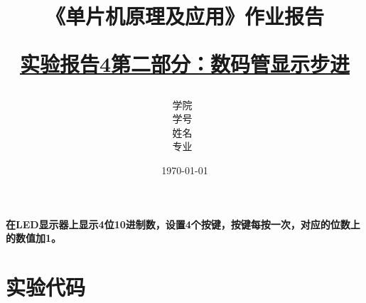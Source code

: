 \documentclass[12pt,hyperref,a4paper,UTF8]{ctexart}
\title{ 
        \vspace{1cm}
        \heiti \Huge \textbf{《单片机原理及应用》作业报告} \par
        \vspace{1cm} 
        \heiti \Large {\underline{实验报告4第二部分：数码管显示步进}   } 
        \vspace{3cm}
    
    }
\author{
        \vspace{0.5cm}
        \kaishu\Large 学院\ \dlmu[9cm]{卓越学院} \\ %
        \vspace{0.5cm}
        \kaishu\Large 学号\ \dlmu[9cm]{23040447} \\ %
        \vspace{0.5cm}
        \kaishu\Large 姓名\ \dlmu[9cm]{陈文轩} \qquad  \\ %
        \vspace{0.5cm}
        \kaishu\Large 专业\ \dlmu[9cm]{智能硬件与系统(电子信息工程)} \qquad \\ %
    }
\date{\today} %
\begin{document}
\cover
\thispagestyle{empty} %







\newpage
\setcounter{page}{1} %



\textbf{在LED显示器上显示4位10进制数，设置4个按键，按键每按一次，对应的位数上的数值加1。}


\section{实验代码}
\end{document}
